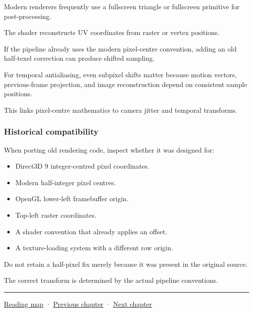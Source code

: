 Modern renderers frequently use a fullscreen triangle or fullscreen primitive for post-processing.

The shader reconstructs UV coordinates from raster or vertex positions.

If the pipeline already uses the modern pixel-centre convention, adding an old half-texel correction can produce shifted sampling.

For temporal antialiasing, even subpixel shifts matter because motion vectors, previous-frame projection, and image reconstruction depend on consistent sample positions.

This links pixel-centre mathematics to camera jitter and temporal transforms.

\subsubsection{Historical compatibility}\label{historical-compatibility}

When porting old rendering code, inspect whether it was designed for:

\begin{itemize}
\tightlist
\item
  Direct3D 9 integer-centred pixel coordinates.
\item
  Modern half-integer pixel centres.
\item
  OpenGL lower-left framebuffer origin.
\item
  Top-left raster coordinates.
\item
  A shader convention that already applies an offset.
\item
  A texture-loading system with a different row origin.
\end{itemize}

Do not retain a half-pixel fix merely because it was present in the original source.

The correct transform is determined by the actual pipeline conventions.

\begin{center}\rule{0.5\linewidth}{0.5pt}\end{center}

\href{Chapter\%20Edition/01\%20-\%20Computing\%20Foundations/00\%20-\%20Reading\%20Map}{Reading map} · \hyperref[02-foundations-ii-ch032]{Previous chapter} · \hyperref[02-foundations-ii-ch034]{Next chapter}
